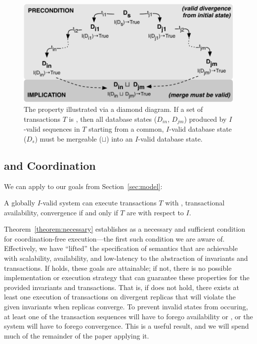 \begin{figure}
\begin{center}
\includegraphics[width=\columnwidth]{figs/icommute.pdf}\vspace{-1em}
\end{center}
\caption{The \iconfluence property illustrated via a diamond
  diagram. If a set of transactions $T$ is \iconfluent, then all
  database states ($D_{in}$, $D_{jm}$) produced by $I$-valid sequences
  in $T$ starting from a common, $I$-valid database state ($D_s$) must
  be mergeable ($\sqcup$) into an $I$-valid database state.}
\label{fig:iconfluence}
\end{figure}

\subsection{\iconfluence and Coordination}

We can apply \iconfluence to our goals from Section~\ref{sec:model}:

\begin{theorem}
\label{theorem:necessary}
A globally $I$-valid system can execute transactions $T$ with
\cfreedom, transactional availability, convergence if and only if $T$
are \iconfluent with respect to $I$.
\end{theorem}

Theorem~\ref{theorem:necessary} establishes \iconfluence as a
necessary and sufficient condition for coordination-free
execution---the first such condition we are aware of. Effectively, we
have ``lifted'' the specification of semantics that are achievable
with scalability, availability, and low-latency to the abstraction of
invariants and transactions. If \iconfluence holds, these goals are
attainable; if not, there is no possible implementation or execution
strategy that can guarantee these properties for the provided
invariants and transactions. That is, if \iconfluence does not hold,
there exists at least one execution of transactions on divergent
replicas that will violate the given invariants when replicas
converge. To prevent invalid states from occuring, at least one of the
transaction sequences will have to forego availability or \cfreedom,
or the system will have to forego convergence. This is a useful
result, and we will spend much of the remainder of the paper applying
it.

